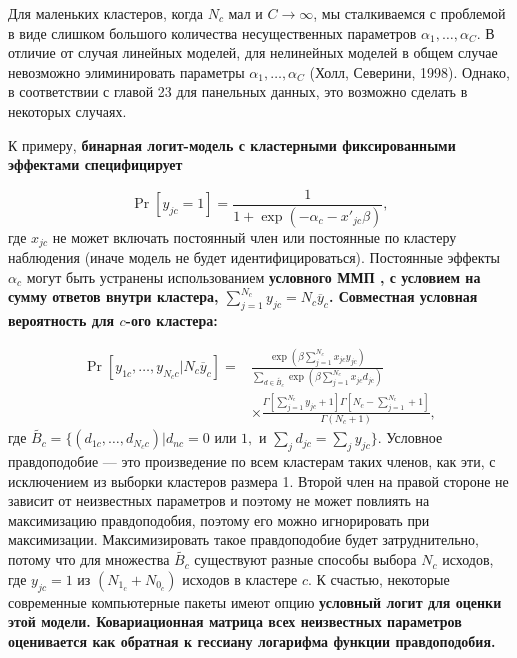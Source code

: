 Для маленьких кластеров, когда $N_c$ мал и $C \to \infty$, мы сталкиваемся с проблемой в виде слишком большого количества несущественных параметров $\alpha_1, \dots, \alpha_C$. В отличие от случая линейных моделей, для нелинейных моделей в общем случае невозможно элиминировать параметры $\alpha_1, \dots, \alpha_C$ (Холл, Северини, 1998). Однако, в соответствии с главой 23 для панельных данных, это возможно сделать в некоторых случаях. 

К примеру, \bfseries бинарная логит-модель с кластерными фиксированными эффектами \mdseries специфицирует

\begin{equation}
\label{eq24.47}
\Pr[y_{jc} = 1] = \frac{1}{1+\exp(-\alpha_c -x'_{jc}\beta)},
\end{equation}
где $x_{jc}$ не может включать постоянный член или постоянные по кластеру наблюдения (иначе модель не будет идентифицироваться). Постоянные эффекты $\alpha_c$ могут быть устранены использованием \bfseries условного ММП \mdseries, с условием на сумму ответов внутри кластера, $\sum_{j=1}^{N_c} y_{jc} = N_c \overline{y}_c$. Совместная условная вероятность для $c$-ого кластера:

\begin{align}
\label{eq24.48}
\Pr[y_{1c}, \dots, y_{N_c c} | N_c \overline{y}_c] = & \frac{\exp(\beta \sum_{j=1}^{N_c} x_{jc} y_{jc})}{\sum_{d \in \widetilde{B_c}} \exp(\beta \sum_{j=1}^{N_c} x_{jc} d_{jc}) }  \nonumber\\
& \times \frac{\Gamma [\sum_{j=1}^{N_c} y_{jc} + 1] \Gamma [N_c - \sum_{j=1}^{N_c} + 1] }{\Gamma (N_c+1)},
\end{align}
где $\widetilde{B_c} = \{ (d_{1c}, \dots, d_{N_c c}) | d_{nc} = 0 \text{ или } 1, \text{ и } \sum_j d_{jc} = \sum_j y_{jc} \}$. Условное правдоподобие --- это произведение по всем кластерам таких членов, как эти, с исключением из выборки кластеров размера 1. Второй член на правой стороне не зависит от неизвестных параметров и поэтому не может повлиять на максимизацию правдоподобия, поэтому его можно игнорировать при максимизации. Максимизировать такое правдоподобие будет затруднительно, потому что для множества $\widetilde{B_c}$ существуют разные способы выбора $N_c$ исходов, где $y_{jc} = 1$ из $(N_{1_c} + N_{0_c})$ исходов в кластере $c$. К счастью, некоторые современные компьютерные пакеты имеют опцию \bfseries условный логит \mdseries для оценки этой модели. Ковариационная матрица всех неизвестных параметров оценивается как обратная к гессиану логарифма функции правдоподобия. 

